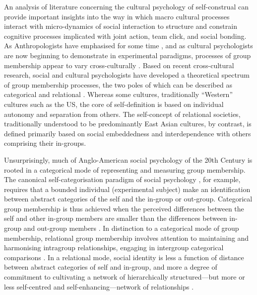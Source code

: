   An analysis of literature concerning the cultural psychology of self-construal can provide important insights into the way in which macro cultural processes interact with micro-dynamics of social interaction to structure and constrain cognitive processes implicated with joint action, team click, and social bonding.  As Anthropologists have emphasised for some time \citep{Strodtbeck1961,Kluckhohn1961,Mead1967,Fei1992}, and as cultural psychologists are now beginning to demonstrate in experimental paradigms, processes of group membership appear to vary cross-culturally \citep{Markus1991,Nisbett2001}.  Based on recent cross-cultural research, social and cultural psychologists have developed a theoretical spectrum of group membership processes, the two poles of which can be described as categorical and relational \citep{Hofstede1980,Brewer2007}.  Whereas some cultures, traditionally ``Western'' cultures such as the US, the core of self-definition is based on individual autonomy and separation from others.
  The self-concept of relational societies, traditionally understood to be predominantly East Asian cultures, by contrast, is defined primarily based on social embeddedness and interdependence with others comprising their in-groups\citep{Leung2012}.

  Unsurprisingly, much of Anglo-American social psychology of the 20th Century is rooted in a categorical mode of representing and measuring group membership.  The canonical self-categorisation paradigm of social psychology \citep{Turner1987}, for example, requires that a bounded individual (experimental subject) make an identification between abstract categories of the self and the in-group or out-group.  Categorical group membership is thus achieved when the perceived differences between the self and other in-group members are smaller than the differences between in-group and out-group members \citep{Yuki2014}.  In distinction to a categorical mode of group membership, relational group membership involves attention to maintaining and harmonising intragroup relationships, engaging in intergroup categorical comparisons \citep{Yuki2003}.
  In a relational mode, social identity is less a function of distance between abstract categories of self and in-group, and more a degree of commitment to cultivating a network of hierarchically structured---but more or less self-centred and self-enhancing---network of relationships \citep{Liu2009,Nisbett2003}.

